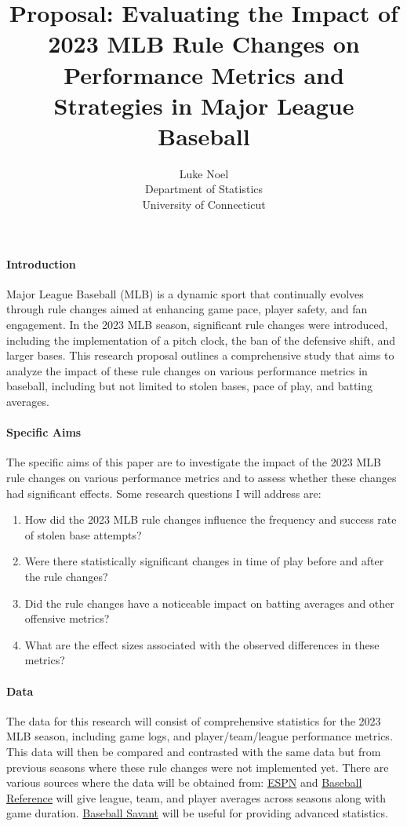 \documentclass[12pt]{article}
\title{Proposal: Evaluating the Impact of 2023 MLB Rule Changes on Performance
 Metrics and Strategies in Major League Baseball}
\author{Luke Noel\\
  Department of Statistics\\
  University of Connecticut
}
\begin{document}
\maketitle


\paragraph{Introduction}
Major League Baseball (MLB) is a dynamic sport that continually evolves through 
rule changes aimed at enhancing game pace, player safety, and fan engagement. In
the 2023 MLB season, significant rule changes were introduced, including the 
implementation of a pitch clock, the ban of the defensive shift, and larger 
bases. This research proposal outlines a comprehensive study that aims to
analyze the impact of these rule changes on various performance metrics in
baseball, including but not limited to stolen bases, pace of play,
and batting averages.


\paragraph{Specific Aims}
The specific aims of this paper are to investigate the impact of the 2023 MLB
rule changes on various performance metrics and to assess whether these changes
had significant effects. Some research questions I will address are:

\begin{enumerate}
  \item How did the 2023 MLB rule changes influence the frequency and success 
  rate of stolen base attempts?
  \item Were there statistically significant changes in time of play before and
   after the rule changes?
  \item Did the rule changes have a noticeable impact on batting averages and 
  other offensive metrics?
  \item What are the effect sizes associated with the observed differences
   in these metrics?
\end{enumerate}


\paragraph{Data}
The data for this research will consist of comprehensive statistics for the 2023
MLB season, including game logs, and player/team/league performance metrics.
This data will then be compared and contrasted with the same data but 
from previous seasons where these rule changes were not implemented yet. There
are various sources where the data will be obtained from: \href{https://www.espn.com/mlb/stats/team/_/season/2023/seasontype/2}{ESPN}
and \href{https://www.baseball-reference.com/}{Baseball Reference} will give
league, team, and player averages across seasons along with game duration.
\href{https://baseballsavant.mlb.com/league?season=2022#statcastHitting}{Baseball Savant}
will be useful for providing advanced statistics.
\end{document}
